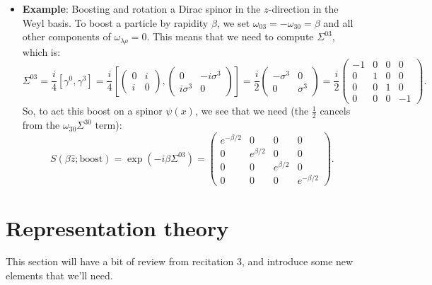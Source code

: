 \documentclass[12pt, oneside]{article}   	%
\theoremstyle{definition}
\begin{document}
\begin{itemize}
	\item \textbf{Example}: Boosting and rotation a Dirac spinor in the $z$-direction in the Weyl basis. To boost a particle by rapidity $\beta$, we set $\omega_{03} = -\omega_{30} = \beta$ and all other components of $\omega_{\lambda\rho} = 0$. This means that we need to compute $\Sigma^{03}$, which is:
	\begin{equation}
		\Sigma^{03} = \frac{i}{4} [\gamma^0, \gamma^3] = \frac{i}{4} \left[ \begin{pmatrix} 0 & i \\ i & 0 \end{pmatrix}, \begin{pmatrix} 0 & -i\sigma^3 \\ i\sigma^3 & 0 \end{pmatrix} \right] = \frac{i}{2} \begin{pmatrix} -\sigma^3  & 0 \\ 0 & \sigma^3 \end{pmatrix} = \frac{i}{2} \begin{pmatrix} -1 & 0 & 0 & 0 \\ 0 & 1 & 0 & 0 \\ 0 & 0 & 1 & 0 \\ 0 & 0 & 0 & -1 \end{pmatrix}. 
	\end{equation}
	So, to act this boost on a spinor $\psi(x)$, we see that we need (the $\frac{1}{2}$ cancels from the $\omega_{30}\Sigma^{30}$ term):
	\begin{equation}
		S(\beta\hat{z}; \mathrm{boost}) = \exp\left(-i \beta \Sigma^{03} \right) = \begin{pmatrix} e^{-\beta / 2} & 0 & 0 & 0 \\ 0 & e^{\beta / 2} & 0 & 0 \\ 0 & 0 & e^{\beta / 2} & 0 \\ 0 & 0 & 0 & e^{-\beta / 2} \end{pmatrix}. \label{eq:boost_1}
	\end{equation}

\end{itemize}

\section*{Representation theory}

This section will have a bit of review from recitation 3, and introduce some new elements that we'll need.
\end{document}
